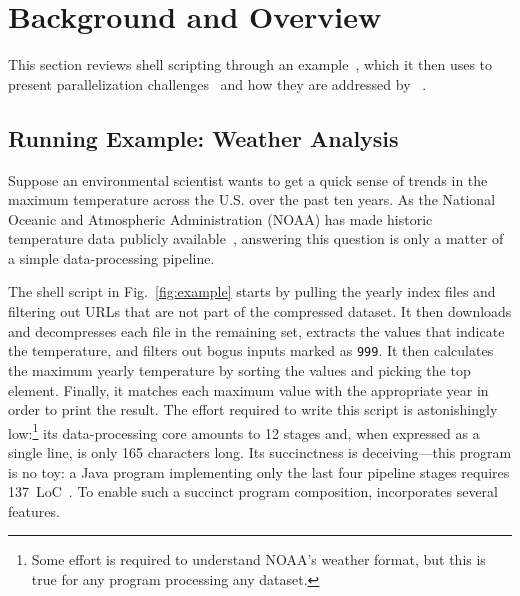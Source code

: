 \documentclass[letterpaper,twocolumn,10pt]{article}
\newcommand{\ttt}[1]{\texttt{#1}}
\begin{document}

\section{Background and Overview}
\label{bg}

This section reviews \unix shell scripting through an example~, which it then uses to present 
parallelization challenges~ and how they are addressed by \sys~.

\subsection{Running Example: Weather Analysis}
\label{bg:pipelines}

Suppose an environmental scientist    %
  wants to get a quick sense of trends in the maximum temperature across the U.S. over the past ten years.
As the National Oceanic and Atmospheric Administration (NOAA) has made historic temperature data publicly available~\cite{noaa}, 
  answering this question is only a matter of a simple data-processing pipeline.

The shell script in Fig.~\ref{fig:example} starts by pulling the yearly index files and filtering out URLs that are not part of the compressed dataset.
It then downloads and decompresses each file in the remaining set, extracts the values that indicate the temperature, and filters out bogus inputs marked as \ttt{999}.
It then calculates the maximum yearly temperature by sorting the values and picking the top element.
Finally, it matches each maximum value with the appropriate year in order to print the result.
% 
The effort required to write this script is astonishingly low:\footnote{
  Some effort is required to understand NOAA's weather format, but this is true for any program processing any dataset.
}
  its data-processing core amounts to 12 stages and, when expressed as a single line, is only 165 characters long.
Its succinctness is deceiving---this program is no toy:
  a Java program implementing only the last four pipeline stages requires 137~LoC~\cite[\S2.1]{hadoop:15}.
To enable such a succinct program composition, \unix incorporates several features.
\end{document}
